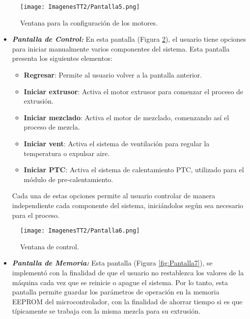\documentclass[14pt,oneside]{extarticle} %
\begin{document}
\begin{figure}[h!]
    \centering
    \texttt{[image: ImagenesTT2/Pantalla5.png]}
    \caption{Ventana para la configuración de los motores.}
    \label{fig:Pantalla5}
\end{figure}

\newpage

\begin{itemize}
    \item \textit{\textbf{Pantalla de Control:}} En esta pantalla (Figura \ref{fig:Pantalla6}), el usuario tiene opciones para iniciar manualmente varios componentes del sistema. Esta pantalla presenta los siguientes elementos:

    \begin{itemize}
        \item \textbf{Regresar}: Permite al usuario volver a la pantalla anterior.
        \item \textbf{Iniciar extrusor}: Activa el motor extrusor para comenzar el proceso de extrusión.
        \item \textbf{Iniciar mezclado}: Activa el motor de mezclado, comenzando así el proceso de mezcla.
        \item \textbf{Iniciar vent}: Activa el sistema de ventilación para regular la temperatura o expulsar aire.
        \item \textbf{Iniciar PTC}: Activa el sistema de calentamiento PTC, utilizado para el módulo de pre-calentamiento. 
    \end{itemize}

Cada una de estas opciones permite al usuario controlar de manera independiente cada componente del sistema, iniciándolos según sea necesario para el proceso.
    
\end{itemize}

\begin{figure}[h!]
    \centering
    \texttt{[image: ImagenesTT2/Pantalla6.png]}
    \caption{Ventana de control.}
    \label{fig:Pantalla6}
\end{figure}

\begin{itemize}
    \item \textit{\textbf{Pantalla de Memoria:}} Esta pantalla (Figura \ref{fig:Pantalla7}), se implementó con la finalidad de que el usuario no restablezca los valores de la máquina cada vez que se reinicie o apague el sistema. Por lo tanto, esta pantalla permite guardar los parámetros de operación en la memoria EEPROM del microcontrolador, con la finalidad de ahorrar tiempo si es que típicamente se trabaja con la misma mezcla para su extrusión. 
\end{itemize}
\end{document}
